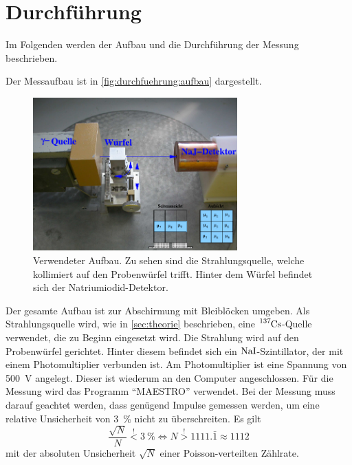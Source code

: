 \section{Durchführung}
\label{sec:durchfuehrung}

    Im Folgenden werden der Aufbau und die Durchführung der Messung beschrieben.

    Der Messaufbau ist in \autoref{fig:durchfuehrung:aufbau} dargestellt.
    \begin{figure}
       \centering
       \includegraphics[width=0.7\textwidth]{content/img/Abb_1.pdf}
       \caption{Verwendeter Aufbau.
       Zu sehen sind die Strahlungsquelle,
       welche kollimiert auf den Probenwürfel trifft.
       Hinter dem Würfel befindet sich der Natriumiodid-Detektor. \cite{versuchsanleitung}}
       \label{fig:durchfuehrung:aufbau}
    \end{figure}
    Der gesamte Aufbau ist zur Abschirmung mit Bleiblöcken umgeben.
    Als Strahlungsquelle wird,
    wie in \autoref{sec:theorie} beschrieben,
    eine $\ce{^{137}Cs}$-Quelle verwendet,
    die zu Beginn eingesetzt wird.
    Die Strahlung wird auf den Probenwürfel gerichtet.
    Hinter diesem befindet sich ein $\ce{NaI}$-Szintillator,
    der mit einem Photomultiplier verbunden ist.
    Am Photomultiplier ist eine Spannung von \SI{500}{\volt} angelegt.
    Dieser ist wiederum an den Computer angeschlossen.
    Für die Messung wird das Programm \enquote{MAESTRO} verwendet.
    Bei der Messung muss darauf geachtet werden,
    dass genügend Impulse gemessen werden,
    um eine relative Unsicherheit von \SI{3}{\percent} nicht zu überschreiten.
    Es gilt
    \begin{equation*}
        \frac{\sqrt{N}}{N} \stackrel{!}{<} \SI{3}{\percent}
        \iff N \stackrel{!}{>} 1111.\bar{1} \approx 1112
    \end{equation*}
    mit der absoluten Unsicherheit $\sqrt{N}$ einer Poisson-verteilten Zählrate.

